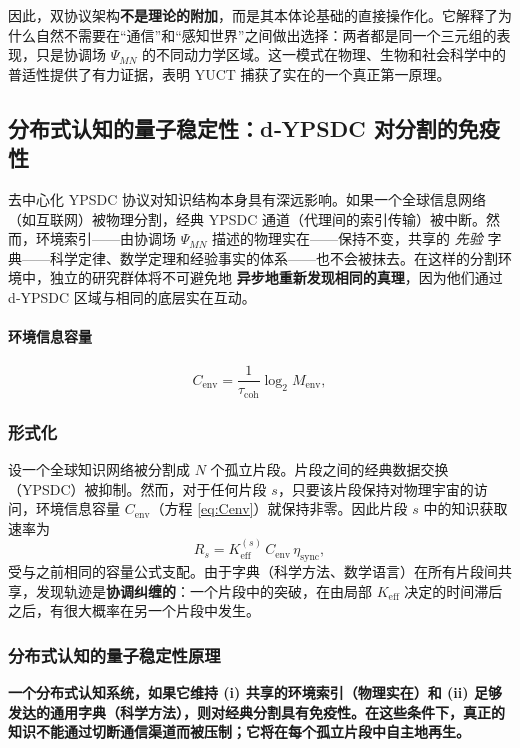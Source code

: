 \documentclass[11pt,a4paper]{article}
\begin{document}
	因此，双协议架构\textbf{不是理论的附加}，而是其本体论基础的直接操作化。它解释了为什么自然不需要在“通信”和“感知世界”之间做出选择：两者都是同一个三元组的表现，只是协调场 \(\Psi_{MN}\) 的不同动力学区域。这一模式在物理、生物和社会科学中的普适性提供了有力证据，表明 YUCT 捕获了实在的一个真正第一原理。
	
	\subsection{分布式认知的量子稳定性：d‑YPSDC 对分割的免疫性}
	\label{subsec:quantum-stability-cognition}
	
	去中心化 YPSDC 协议对知识结构本身具有深远影响。如果一个全球信息网络（如互联网）被物理分割，经典 YPSDC 通道（代理间的索引传输）被中断。然而，环境索引——由协调场 \(\Psi_{MN}\) 描述的物理实在——保持不变，共享的 \emph{先验} 字典——科学定律、数学定理和经验事实的体系——也不会被抹去。在这样的分割环境中，独立的研究群体将不可避免地 \textbf{异步地重新发现相同的真理}，因为他们通过 d‑YPSDC 区域与相同的底层实在互动。
	
	\paragraph{环境信息容量}
	\[
	C_{\mathrm{env}} = \frac{1}{\tau_{\mathrm{coh}}} \log_2 M_{\mathrm{env}},
	\label{eq:Cenv}
	\]
	
	\subsubsection*{形式化}
	设一个全球知识网络被分割成 \(N\) 个孤立片段。片段之间的经典数据交换（YPSDC）被抑制。然而，对于任何片段 \(s\)，只要该片段保持对物理宇宙的访问，环境信息容量 \(C_{\mathrm{env}}\)（方程 \ref{eq:Cenv}）就保持非零。因此片段 \(s\) 中的知识获取速率为
	\[
	R_s = K_{\mathrm{eff}}^{(s)} \, C_{\mathrm{env}} \, \eta_{\mathrm{sync}},
	\]
	受与之前相同的容量公式支配。由于字典（科学方法、数学语言）在所有片段间共享，发现轨迹是\textbf{协调纠缠的}：一个片段中的突破，在由局部 \(K_{\mathrm{eff}}\) 决定的时间滞后之后，有很大概率在另一个片段中发生。
	
	\subsubsection*{分布式认知的量子稳定性原理}
	\textbf{一个分布式认知系统，如果它维持 (i) 共享的环境索引（物理实在）和 (ii) 足够发达的通用字典（科学方法），则对经典分割具有免疫性。在这些条件下，真正的知识不能通过切断通信渠道而被压制；它将在每个孤立片段中自主地再生。}
	
\end{document}
